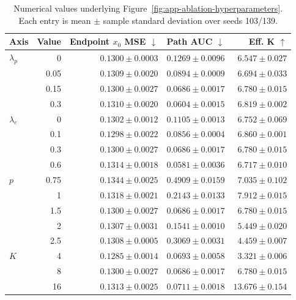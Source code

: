 \begin{table}[t]
  \centering
  \small
  \caption{Numerical values underlying
  Figure~\ref{fig:app-ablation-hyperparameters}. Each entry is mean $\pm$
  sample standard deviation over seeds 103/139.}
  \label{tab:app-hyperparameter-values}
  \begin{tabular}{lrrrr}
    \toprule
    Axis & Value & Endpoint $x_0$ MSE $\downarrow$ & Path AUC $\downarrow$ & Eff. K $\uparrow$ \\
    \midrule
    $\lambda_p$ & 0 & $0.1300 \pm 0.0003$ & $0.1269 \pm 0.0096$ & $6.547 \pm 0.027$ \\
 & 0.05 & $0.1309 \pm 0.0020$ & $0.0894 \pm 0.0009$ & $6.694 \pm 0.033$ \\
 & 0.15 & $0.1300 \pm 0.0027$ & $0.0686 \pm 0.0017$ & $6.780 \pm 0.015$ \\
 & 0.3 & $0.1310 \pm 0.0020$ & $0.0604 \pm 0.0015$ & $6.819 \pm 0.002$ \\
\midrule
$\lambda_c$ & 0 & $0.1302 \pm 0.0012$ & $0.1105 \pm 0.0013$ & $6.752 \pm 0.069$ \\
 & 0.1 & $0.1298 \pm 0.0022$ & $0.0856 \pm 0.0004$ & $6.860 \pm 0.001$ \\
 & 0.3 & $0.1300 \pm 0.0027$ & $0.0686 \pm 0.0017$ & $6.780 \pm 0.015$ \\
 & 0.6 & $0.1314 \pm 0.0018$ & $0.0581 \pm 0.0036$ & $6.717 \pm 0.010$ \\
\midrule
$p$ & 0.75 & $0.1344 \pm 0.0025$ & $0.4909 \pm 0.0159$ & $7.035 \pm 0.102$ \\
 & 1 & $0.1318 \pm 0.0021$ & $0.2143 \pm 0.0133$ & $7.912 \pm 0.015$ \\
 & 1.5 & $0.1300 \pm 0.0027$ & $0.0686 \pm 0.0017$ & $6.780 \pm 0.015$ \\
 & 2 & $0.1307 \pm 0.0031$ & $0.1541 \pm 0.0010$ & $5.449 \pm 0.020$ \\
 & 2.5 & $0.1308 \pm 0.0005$ & $0.3069 \pm 0.0031$ & $4.459 \pm 0.007$ \\
\midrule
$K$ & 4 & $0.1285 \pm 0.0014$ & $0.0693 \pm 0.0058$ & $3.321 \pm 0.006$ \\
 & 8 & $0.1300 \pm 0.0027$ & $0.0686 \pm 0.0017$ & $6.780 \pm 0.015$ \\
 & 16 & $0.1313 \pm 0.0025$ & $0.0711 \pm 0.0018$ & $13.676 \pm 0.154$\\
    \bottomrule
  \end{tabular}
\end{table}


